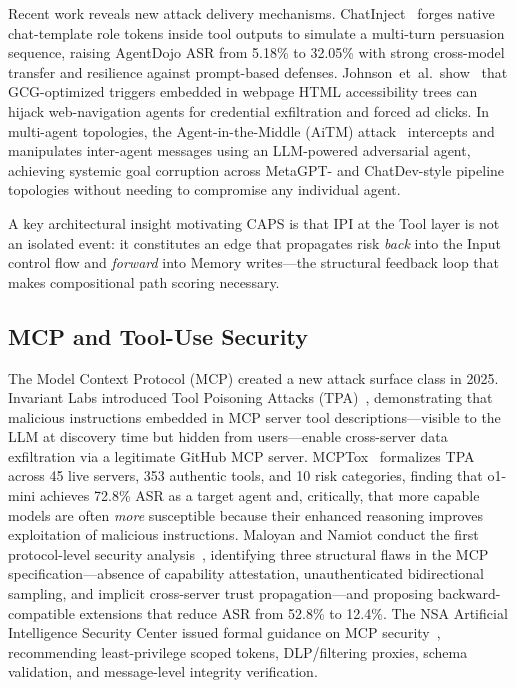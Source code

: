 Recent work reveals new attack delivery mechanisms.
ChatInject~\cite{chang2025chatinject} forges native chat-template role tokens
inside tool outputs to simulate a multi-turn persuasion sequence, raising
AgentDojo ASR from 5.18\% to 32.05\% with strong cross-model transfer and
resilience against prompt-based defenses. Johnson~et~al.\
show~\cite{johnson2025htmlipi} that GCG-optimized triggers embedded in
webpage HTML accessibility trees can hijack web-navigation agents for
credential exfiltration and forced ad clicks. In multi-agent topologies, the
Agent-in-the-Middle (AiTM) attack~\cite{he2025aitm} intercepts and
manipulates inter-agent messages using an LLM-powered adversarial agent,
achieving systemic goal corruption across MetaGPT- and ChatDev-style pipeline
topologies without needing to compromise any individual agent.

A key architectural insight motivating CAPS is that IPI at the Tool layer is
not an isolated event: it constitutes an edge that propagates risk \emph{back}
into the Input control flow and \emph{forward} into Memory writes---the
structural feedback loop that makes compositional path scoring necessary.


\subsection{MCP and Tool-Use Security}

The Model Context Protocol (MCP) created a new attack surface class in 2025.
Invariant Labs introduced Tool Poisoning Attacks (TPA)~\cite{invariantlabs2025mcp},
demonstrating that malicious instructions embedded in MCP server tool
descriptions---visible to the LLM at discovery time but hidden from
users---enable cross-server data exfiltration via a legitimate GitHub MCP
server.
MCPTox~\cite{wang2025mcptox} formalizes TPA across 45 live servers, 353
authentic tools, and 10 risk categories, finding that o1-mini achieves 72.8\%
ASR as a target agent and, critically, that more capable models are often
\emph{more} susceptible because their enhanced reasoning improves exploitation
of malicious instructions.
Maloyan and Namiot conduct the first protocol-level security
analysis~\cite{maloyan2026protocol}, identifying three structural flaws in the
MCP specification---absence of capability attestation, unauthenticated
bidirectional sampling, and implicit cross-server trust propagation---and
proposing backward-compatible extensions that reduce ASR from 52.8\% to
12.4\%.
The NSA Artificial Intelligence Security Center issued formal guidance on MCP
security~\cite{nsa2026mcp}, recommending least-privilege scoped tokens,
DLP/filtering proxies, schema validation, and message-level integrity
verification.

